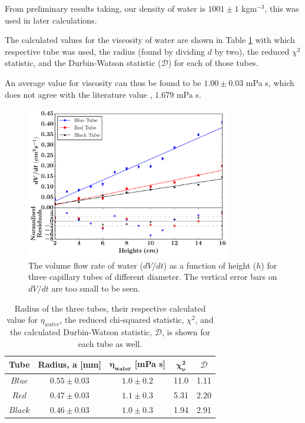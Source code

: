 \documentclass[twocolumn]{revtex4}
\begin{document}
From preliminary results taking, our density of water is ${1001 \pm 1}$ kgm$^{-3}$, this was used in later calculations.

The calculated values for the viscosity of water are shown in Table \ref{table:1} with which respective tube was used, the radius (found by dividing $d$ by two), the reduced $\chi^2$ statistic, and the Durbin-Watson statistic ($\mathcal{D}$) for each of those tubes. 

An average value for viscosity can thus be found to be $1.00 \pm 0.03$ mPa s, which does not agree with the literature value \cite{crc}, $1.679$  mPa {s}. 

\vspace{-1ex}
\begin{figure}[!h]
\begin{center}
\includegraphics[width=9cm]{fig1-3}
\caption[]{The volume flow rate of water ($dV/dt$) as a function of height ($h$) for three capillary tubes of different diameter. The vertical error bars on $dV/dt$ are too small to be seen.}
\label{fig:fig2}
\end{center}
\end{figure}

\begin{table}[h!]
\centering
\begin{tabular}{ |c|c|c|c|c| } 
 \hline
 \textbf{Tube} & \textbf{Radius, a [mm]} & \textbf{$\boldsymbol{\eta_{water}}$ [mPa {s}]} & \textbf{$\boldsymbol{\chi^2_{\nu}}$} & $\mathcal{D}$\\ [0.5ex] 
 \hline\hline
 $Blue$ &$0.55\pm0.03$ & $1.0\pm0.2$ & 11.0 & 1.11\\ 
 $Red$ & $0.47\pm0.03$ & $1.1\pm0.3$ & 5.31 & 2.20\\
 $Black$ & $0.46\pm0.03$ & $1.0\pm0.3$ & 1.94 & 2.91\\
 
 \hline
\end{tabular}
\caption{Radius of the three tubes, their respective calculated value for $\eta_{water}$, the reduced chi-squared statistic, $\chi^2$, and the calculated Durbin-Watson statistic, $\mathcal{D}$, is shown for each tube as well.}
\label{table:1}
\end{table}
\end{document}

